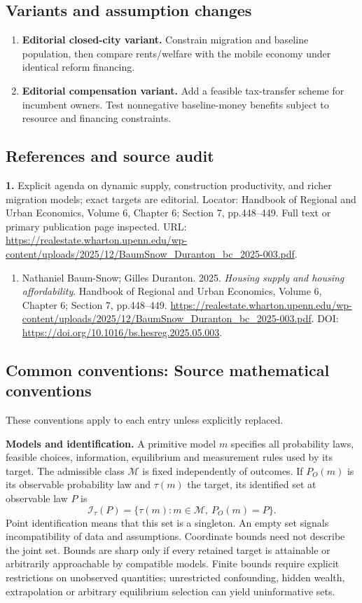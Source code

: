 \documentclass[11pt,a4paper]{article}
\begin{document}
\subsection*{Variants and assumption changes}
\begin{enumerate}
\item \textbf{Editorial closed-city variant.} Constrain migration and baseline population, then compare rents/welfare with the mobile economy under identical reform financing.
\item \textbf{Editorial compensation variant.} Add a feasible tax-transfer scheme for incumbent owners. Test nonnegative baseline-money benefits subject to resource and financing constraints.
\end{enumerate}
\subsection*{References and source audit}
\textbf{1.} Explicit agenda on dynamic supply, construction productivity, and richer migration models; exact targets are editorial. Locator: Handbook of Regional and Urban Economics, Volume 6, Chapter 6; Section 7, pp.448–449. Full text or primary publication page inspected. URL: \url{https://realestate.wharton.upenn.edu/wp-content/uploads/2025/12/BaumSnow_Duranton_bc_2025-003.pdf}.
\begin{enumerate}\raggedright
\item\hypertarget{definitions:source:30007743:1}{} Nathaniel Baum-Snow; Gilles Duranton. 2025. \emph{Housing supply and housing affordability}. Handbook of Regional and Urban Economics, Volume 6, Chapter 6; Section 7, pp.448–449.
\url{https://realestate.wharton.upenn.edu/wp-content/uploads/2025/12/BaumSnow_Duranton_bc_2025-003.pdf}.
DOI: \url{https://doi.org/10.1016/bs.hesreg.2025.05.003}.
\end{enumerate}

\subsection*{Common conventions: Source mathematical conventions}

These conventions apply to each entry unless explicitly replaced.

\textbf{Models and identification.} A primitive model \(m\) specifies all probability laws, feasible choices, information, equilibrium and measurement rules used by its target. The admissible class \(\mathcal M\) is fixed independently of outcomes. If \(P_O(m)\) is its observable probability law and \(\tau(m)\) the target, its identified set at observable law \(P\) is
\[
 \mathcal I_\tau(P)=\{\tau(m):m\in\mathcal M,\ P_O(m)=P\}.
\]
Point identification means that this set is a singleton. An empty set signals incompatibility of data and assumptions. Coordinate bounds need not describe the joint set. Bounds are sharp only if every retained target is attainable or arbitrarily approachable by compatible models. Finite bounds require explicit restrictions on unobserved quantities; unrestricted confounding, hidden wealth, extrapolation or arbitrary equilibrium selection can yield uninformative sets.
\end{document}
